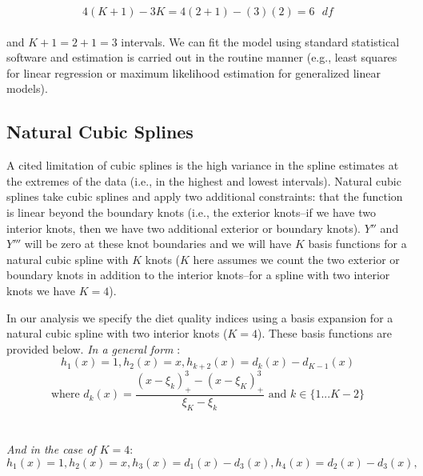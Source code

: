 \documentclass{article}
\begin{document}
$$4(K+1)-3K=4(2+1)-(3)(2)=6\text{ }{df}$$
\\
\noindent and $K+1=2+1=3$ intervals. We can fit the model using standard statistical software and estimation is carried out in the routine manner (e.g., least squares for linear regression or maximum likelihood estimation for generalized linear models).

\vspace{0.5cm} %
\subsection*{\textbf{Natural Cubic Splines}}
\hspace{\parindent} A cited limitation of cubic splines is the high variance in the spline estimates at the extremes of the data (i.e., in the highest and lowest intervals). \supercite{hastie_elements_2009} Natural cubic splines take cubic splines and apply two additional constraints: that the function is linear beyond the boundary knots (i.e., the exterior knots--if we have two interior knots, then we have two additional exterior or boundary knots). $Y''$ and $Y'''$ will be zero at these knot boundaries and we will have $K$ basis functions for a natural cubic spline with $K$ knots ($K$ here assumes we count the two exterior or boundary knots in addition to the interior knots--for a spline with two interior knots we have $K=4$). 

\hspace{\parindent} In our analysis we specify the diet quality indices using a basis expansion for a natural cubic spline with two interior knots ($K=4$). These basis functions are provided below.
\newline
\newline
\textit{In a general form}\supercite{hastie_elements_2009} :
\\
$$h_1(x)=1,h_2(x)=x, h_{k+2}(x)=d_k(x)-d_{K-1}(x)$$
$$\text{where } d_k(x)=\frac{(x-\xi_k)^3_+-(x-\xi_K)^3_+}{\xi_K-\xi_k} \text{ and } k\in\{1...K-2\}$$
\\
\\
\textit{And in the case of $K=4$}:
$$h_1(x)=1,h_2(x)=x, h_{3}(x)=d_1(x)-d_{3}(x),h_{4}(x)=d_2(x)-d_{3}(x),$$
\\
\\
\end{document}
